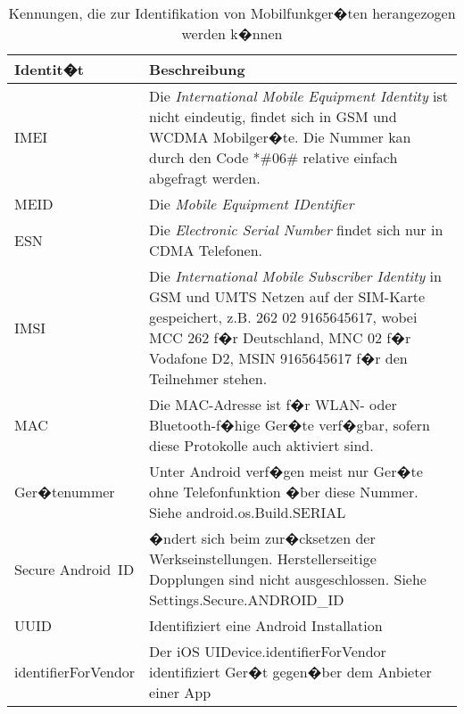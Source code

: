 \begin{table}[t]
\caption{Kennungen, die zur Identifikation von Mobilfunkger�ten herangezogen werden k�nnen}
\label{mobile-kennungen}
\small\renewcommand{\arraystretch}{1.5}
\begin{tabularx}{\linewidth}{p{3.1cm}L}
\hline
Identit�t & Beschreibung\\\hline

IMEI & Die \textit{International Mobile Equipment Identity} ist nicht eindeutig, findet sich in GSM und WCDMA Mobilger�te. Die Nummer kan durch den Code *\#06\# relative einfach abgefragt werden. \\

MEID & Die \textit{Mobile Equipment IDentifier} \\ 

ESN & Die \textit{Electronic Serial Number} findet sich nur in CDMA Telefonen.\\

IMSI & Die \textit{International Mobile Subscriber Identity} in GSM und UMTS Netzen auf der SIM-Karte gespeichert, z.B. 262 02 9165645617, wobei MCC 262 f�r Deutschland, MNC 02 f�r Vodafone D2, MSIN 9165645617 f�r den Teilnehmer stehen.\\

MAC & Die MAC-Adresse ist f�r WLAN- oder Bluetooth-f�hige Ger�te verf�gbar, sofern diese Protokolle auch aktiviert sind.\\

Ger�tenummer & Unter Android verf�gen meist nur Ger�te ohne Telefonfunktion �ber diese Nummer. Siehe android.os.Build.SERIAL\\

Secure Android~ID & �ndert sich beim zur�cksetzen der Werkseinstellungen. Herstellerseitige Dopplungen sind nicht ausgeschlossen. Siehe Settings.Secure.ANDROID\_ID\\

UUID & Identifiziert eine Android Installation\\

identifierForVendor & Der iOS UIDevice.identifierForVendor identifiziert Ger�t gegen�ber dem Anbieter einer App\\ 
\hline
\end{tabularx}
\end{table}

